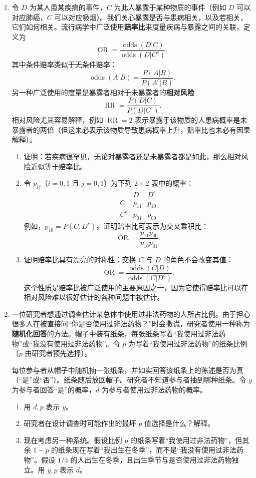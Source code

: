 \documentclass[UTF8,12pt,a4paper,fontset=fandol]{ctexart}
\begin{document}
\begin{enumerate}
  \item 令 $D$ 为某人患某疾病的事件，$C$ 为此人暴露于某种物质的事件（例如 $D$ 可以对应肺癌，$C$ 可以对应吸烟）。我们关心暴露是否与患病相关，以及若相关，它们如何相关。流行病学中广泛使用\textbf{赔率比}来度量疾病与暴露之间的关联，定义为
  \[
    \operatorname{OR}=\frac{\operatorname{odds}(D|C)}
                           {\operatorname{odds}(D|C^c)},
  \]
  其中条件赔率类似于无条件赔率：
  \[
    \operatorname{odds}(A|B)=\frac{P(A|B)}{P(A^c|B)}.
  \]
  另一种广泛使用的度量是暴露者相对于未暴露者的\textbf{相对风险}
  \[
    \operatorname{RR}=\frac{P(D|C)}{P(D|C^c)}.
  \]
  相对风险尤其容易解释，例如 $\operatorname{RR}=2$ 表示暴露于该物质的人患病概率是未暴露者的两倍（但这未必表示该物质导致患病概率上升，赔率比也未必有因果解释）。
  \begin{enumerate}
    \item 证明：若疾病很罕见，无论对暴露者还是未暴露者都是如此，那么相对风险近似等于赔率比。
    \item 令 $p_{ij}$（$i=0,1$ 且 $j=0,1$）为下列 $2\times 2$ 表中的概率：
    \[
    \begin{array}{c|cc}
      & D & D^c\\
      \hline
      C & p_{11} & p_{10}\\
      C^c & p_{01} & p_{00}
    \end{array}
    \]
    例如，$p_{10}=P(C,D^c)$。证明赔率比可表示为交叉乘积比：
    \[
      \operatorname{OR}=\frac{p_{11}p_{00}}{p_{10}p_{01}}.
    \]
    \item 证明赔率比具有漂亮的对称性：交换 $C$ 与 $D$ 的角色不会改变其值：
    \[
      \operatorname{OR}=\frac{\operatorname{odds}(C|D)}
                              {\operatorname{odds}(C|D^c)}.
    \]
    这个性质是赔率比被广泛使用的主要原因之一，因为它使得赔率比可以在相对风险难以很好估计的各种问题中被估计。
  \end{enumerate}

  \item 一位研究者想通过调查估计某总体中使用过非法药物的人所占比例。由于担心很多人在被直接问“你是否使用过非法药物？”时会撒谎，研究者使用一种称为\textbf{随机化回答}的方法。帽子中装有纸条，每张纸条写着“我使用过非法药物”或“我没有使用过非法药物”。令 $p$ 为写着“我使用过非法药物”的纸条比例（$p$ 由研究者预先选择）。

  每位参与者从帽子中随机抽一张纸条，并如实回答该纸条上的陈述是否为真（“是”或“否”）。纸条随后放回帽子。研究者不知道参与者抽到哪种纸条。令 $y$ 为参与者回答“是”的概率，$d$ 为参与者使用过非法药物的概率。
  \begin{enumerate}
    \item 用 $d,p$ 表示 $y$。
    \item 研究者在设计调查时可能作出的最坏 $p$ 值选择是什么？解释。
    \item 现在考虑另一种系统。假设比例 $p$ 的纸条写着“我使用过非法药物”，但其余 $1-p$ 的纸条现在写着“我出生在冬季”，而不是“我没有使用过非法药物”。假设 $1/4$ 的人出生在冬季，且出生季节与是否使用过非法药物独立。用 $y,p$ 表示 $d$。
  \end{enumerate}


\end{enumerate}
\end{document}
